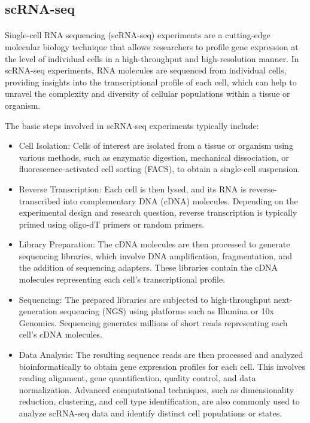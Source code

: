 \documentclass[12pt]{extarticle}
\begin{document}
\newpage

\subsection{scRNA-seq}

\paragraph{} Single-cell RNA sequencing (scRNA-seq) experiments are a cutting-edge molecular biology technique that allows researchers to profile gene expression at the level of individual cells in a high-throughput and high-resolution manner. In scRNA-seq experiments, RNA molecules are sequenced from individual cells, providing insights into the transcriptional profile of each cell, which can help to unravel the complexity and diversity of cellular populations within a tissue or organism.

The basic steps involved in scRNA-seq experiments typically include:

\begin{itemize}
    \item Cell Isolation: Cells of interest are isolated from a tissue or organism using various methods, such as enzymatic digestion, mechanical dissociation, or fluorescence-activated cell sorting (FACS), to obtain a single-cell suspension.

    \item Reverse Transcription: Each cell is then lysed, and its RNA is reverse-transcribed into complementary DNA (cDNA) molecules. Depending on the experimental design and research question, reverse transcription is typically primed using oligo-dT primers or random primers.

    \item Library Preparation: The cDNA molecules are then processed to generate sequencing libraries, which involve DNA amplification, fragmentation, and the addition of sequencing adapters. These libraries contain the cDNA molecules representing each cell's transcriptional profile.

    \item Sequencing: The prepared libraries are subjected to high-throughput next-generation sequencing (NGS) using platforms such as Illumina or 10x Genomics. Sequencing generates millions of short reads representing each cell's cDNA molecules.

    \item Data Analysis: The resulting sequence reads are then processed and analyzed bioinformatically to obtain gene expression profiles for each cell. This involves reading alignment, gene quantification, quality control, and data normalization. Advanced computational techniques, such as dimensionality reduction, clustering, and cell type identification, are also commonly used to analyze scRNA-seq data and identify distinct cell populations or states.
\end{itemize}
\end{document}
